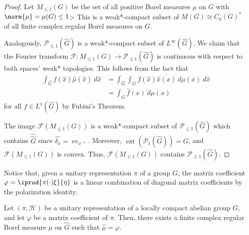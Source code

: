 \documentclass[10pt]{mypackage}
\begin{document}
\begin{proof}
  Let $M_{\leq 1}(G)$ be the set of all positive Borel measures $\mu$ on $G$ with $\norm{\mu} = \mu(G)\leq 1$> This is a weak*-compact subset of $M(G)\cong C_0\left( G \right)^{\ast}$ of all finite complex regular Borel measures on $G$.

  Analogously, $\mathcal{P}_{\leq 1}\left( \hat{G} \right)$ is a weak*-compact subset of $L^{\infty}\left( \hat{G} \right)$. We claim that the Fourier transform $\mathcal{F}\colon M_{\leq 1}\left( G \right)\to \mathcal{P}_{\leq 1}\left( \hat{G} \right)$ is continuous with respect to both spaces' weak* topologies. This follows from the fact that
  \begin{align*}
    \int_{\hat{G}}^{} f\left( \hat{x} \right)\hat{\mu}\left( \hat{x} \right)\:d\hat{x} &= \int_{\hat{G}}^{} \int_{G}^{} f\left( \hat{x} \right) \overline{\hat{x}\left( x \right)}\:d\mu(x)\:d\hat{x}\\
                                                   &= \int_{G}^{} \hat{f}\left( x \right)\:d\mu(x)
  \end{align*}
  for all $f\in L^1\left( \hat{G} \right)$ by Fubini's Theorem.

  The image $\mathcal{F}\left( M_{\leq 1}(G) \right)$ is a weak*-compact subset of $\mathcal{P}_{\leq 1}\left( \hat{G} \right)$ which contains $\hat{\hat{G}}$ since $\hat{\delta_x} = \operatorname{ev}_{x^{-1}}$. Moreover, $\operatorname{ext}\left( \mathcal{P}_{1}\left( \hat{G} \right) \right) = G$, and $\mathcal{F}\left( M_{\leq 1}(G) \right)$ is convex. Thus, $\mathcal{F}\left( M_{\leq 1}(G) \right)$ contains $ \mathcal{P}_{\leq 1}\left( \hat{G} \right) $.
\end{proof}
Notice that, given a unitary representation $\pi$ of a group $G$, the matrix coefficient $\varphi = \iprod{\pi(\cdot)\xi}{\eta}$ is a linear combination of diagonal matrix coefficients by the polarization identity.
\begin{corollary}
  Let $\left( \pi,\mathscr{H} \right)$ be a unitary representation of a locally compact abelian group $G$, and let $\varphi$ be a matrix coefficient of $\pi$. Then, there exists a finite complex regular Borel measure $\mu$ on $\hat{G}$ such that $\hat{\mu} = \varphi$.
\end{corollary}
\end{document}
